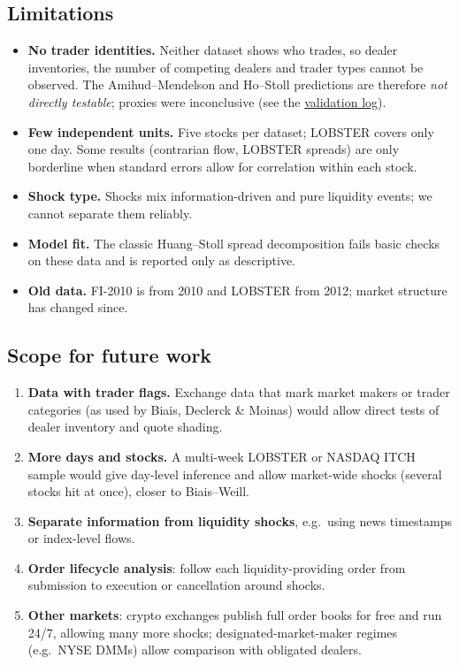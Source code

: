 \documentclass[11pt,a4paper]{article}
\begin{document}
\subsection{Limitations}
\begin{itemize}
\item \textbf{No trader identities.} Neither dataset shows who trades, so dealer inventories, the number of
      competing dealers and trader types cannot be observed. The Amihud--Mendelson and Ho--Stoll predictions
      are therefore \emph{not directly testable}; proxies were inconclusive (see the
      \href{https://github.com/sharanyabaidya/Market_Micro_Project/blob/main/VALIDATION_LOG.md}{validation log}).
\item \textbf{Few independent units.} Five stocks per dataset; LOBSTER covers only one day. Some results
      (contrarian flow, LOBSTER spreads) are only borderline when standard errors allow for correlation within
      each stock.
\item \textbf{Shock type.} Shocks mix information-driven and pure liquidity events; we cannot separate them
      reliably.
\item \textbf{Model fit.} The classic Huang--Stoll spread decomposition fails basic checks on these data and is
      reported only as descriptive.
\item \textbf{Old data.} FI-2010 is from 2010 and LOBSTER from 2012; market structure has changed since.
\end{itemize}

\subsection{Scope for future work}
\begin{enumerate}
\item \textbf{Data with trader flags.} Exchange data that mark market makers or trader categories (as used by
      Biais, Declerck \& Moinas) would allow direct tests of dealer inventory and quote shading.
\item \textbf{More days and stocks.} A multi-week LOBSTER or NASDAQ ITCH sample would give day-level inference
      and allow market-wide shocks (several stocks hit at once), closer to Biais--Weill.
\item \textbf{Separate information from liquidity shocks}, e.g.\ using news timestamps or index-level flows.
\item \textbf{Order lifecycle analysis}: follow each liquidity-providing order from submission to execution or
      cancellation around shocks.
\item \textbf{Other markets}: crypto exchanges publish full order books for free and run 24/7, allowing many more
      shocks; designated-market-maker regimes (e.g.\ NYSE DMMs) allow comparison with obligated dealers.
\end{enumerate}
\end{document}
